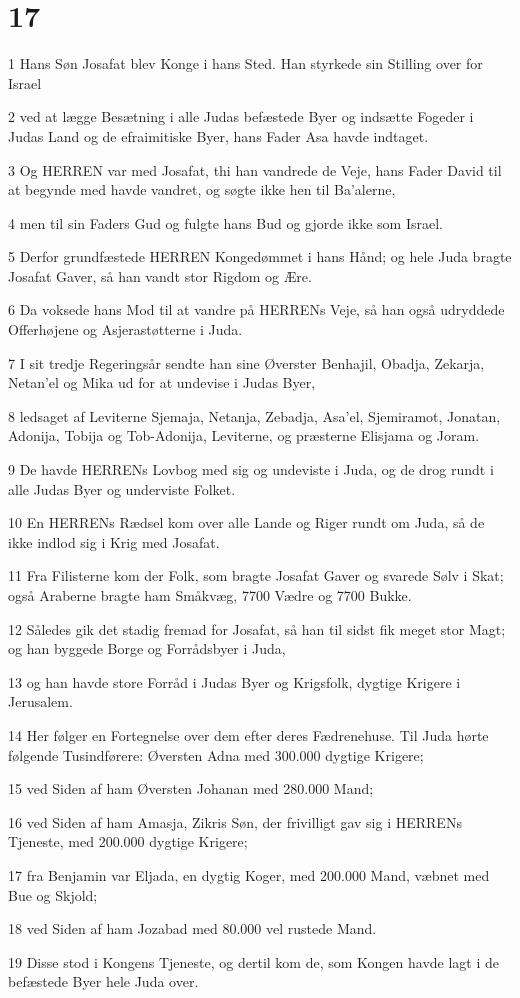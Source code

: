 \chapter{17}

\par 1 Hans Søn Josafat blev Konge i hans Sted. Han styrkede sin Stilling over for Israel
\par 2 ved at lægge Besætning i alle Judas befæstede Byer og indsætte Fogeder i Judas Land og de efraimitiske Byer, hans Fader Asa havde indtaget.
\par 3 Og HERREN var med Josafat, thi han vandrede de Veje, hans Fader David til at begynde med havde vandret, og søgte ikke hen til Ba'alerne,
\par 4 men til sin Faders Gud og fulgte hans Bud og gjorde ikke som Israel.
\par 5 Derfor grundfæstede HERREN Kongedømmet i hans Hånd; og hele Juda bragte Josafat Gaver, så han vandt stor Rigdom og Ære.
\par 6 Da voksede hans Mod til at vandre på HERRENs Veje, så han også udryddede Offerhøjene og Asjerastøtterne i Juda.
\par 7 I sit tredje Regeringsår sendte han sine Øverster Benhajil, Obadja, Zekarja, Netan'el og Mika ud for at undevise i Judas Byer,
\par 8 ledsaget af Leviterne Sjemaja, Netanja, Zebadja, Asa'el, Sjemiramot, Jonatan, Adonija, Tobija og Tob-Adonija, Leviterne, og præsterne Elisjama og Joram.
\par 9 De havde HERRENs Lovbog med sig og undeviste i Juda, og de drog rundt i alle Judas Byer og underviste Folket.
\par 10 En HERRENs Rædsel kom over alle Lande og Riger rundt om Juda, så de ikke indlod sig i Krig med Josafat.
\par 11 Fra Filisterne kom der Folk, som bragte Josafat Gaver og svarede Sølv i Skat; også Araberne bragte ham Småkvæg, 7700 Vædre og 7700 Bukke.
\par 12 Således gik det stadig fremad for Josafat, så han til sidst fik meget stor Magt; og han byggede Borge og Forrådsbyer i Juda,
\par 13 og han havde store Forråd i Judas Byer og Krigsfolk, dygtige Krigere i Jerusalem.
\par 14 Her følger en Fortegnelse over dem efter deres Fædrenehuse. Til Juda hørte følgende Tusindførere: Øversten Adna med 300.000 dygtige Krigere;
\par 15 ved Siden af ham Øversten Johanan med 280.000 Mand;
\par 16 ved Siden af ham Amasja, Zikris Søn, der frivilligt gav sig i HERRENs Tjeneste, med 200.000 dygtige Krigere;
\par 17 fra Benjamin var Eljada, en dygtig Koger, med 200.000 Mand, væbnet med Bue og Skjold;
\par 18 ved Siden af ham Jozabad med 80.000 vel rustede Mand.
\par 19 Disse stod i Kongens Tjeneste, og dertil kom de, som Kongen havde lagt i de befæstede Byer hele Juda over.

